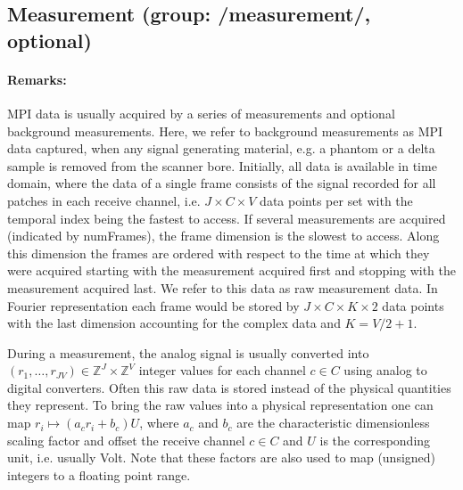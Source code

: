 \documentclass[landscape,a4paper]{article} %
\newcommand{\inlvar}[1]{{\ttfamily#1}}
\begin{document}
\subsection{Measurement (group: \inlvar{/measurement/}, optional)}
\begin{multicols}{2}

\paragraph{Remarks:}
MPI data is usually acquired by a series of measurements and optional background measurements. Here, we refer to background measurements as MPI data captured, when any signal generating material, e.g. a phantom or a delta sample is removed from the scanner bore. Initially, all data is available in time domain, where the data of a single frame consists of the signal recorded for all patches in each receive channel, i.e. $J \times C \times V$ data points per set with the temporal index being the fastest to access.  If several measurements are acquired (indicated by \inlvar{numFrames}), the frame dimension is the slowest to access. Along this dimension the frames are ordered with respect to the time at which they were acquired starting with the measurement acquired first and stopping with the measurement acquired last. We refer to this data as raw measurement data. In Fourier representation each frame would be stored by $J \times C\times K \times 2$ data points with the last dimension accounting for the complex data and $K = V/2 +1$.

During a measurement, the analog signal is usually converted into $(r_1,\dots,r_{JV}) \in \mathbb Z^J \times \mathbb Z^V$ integer values for each channel $c\in C$ using analog to digital converters. Often this raw data is stored instead of the physical quantities they represent. To bring the raw values into a physical representation one can map $r_i \mapsto (a_c r_i + b_c) U$, where $a_c$ and $b_c$ are the characteristic dimensionless scaling factor and offset the receive channel $c \in C$ and $U$ is the corresponding \inlvar{unit}, i.e. usually Volt. Note that these factors are also used to map (unsigned) integers to a floating point range.


\end{multicols}
\end{document}

